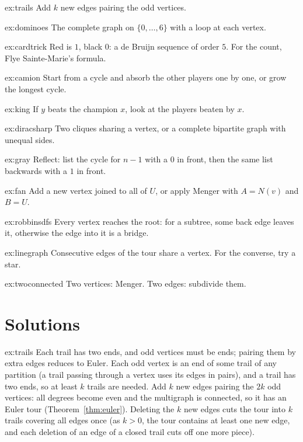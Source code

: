 \begin{hint}{ex:trails}
Add $k$ new edges pairing the odd vertices.
\end{hint}
\begin{hint}{ex:dominoes}
The complete graph on $\{0,\dots,6\}$ with a loop at each vertex.
\end{hint}
\begin{hint}{ex:cardtrick}
Red is $1$, black $0$: a de Bruijn sequence of order $5$. For the count, Flye Sainte-Marie's formula.
\end{hint}
\begin{hint}{ex:camion}
Start from a cycle and absorb the other players one by one, or grow the longest cycle.
\end{hint}
\begin{hint}{ex:king}
If $y$ beats the champion $x$, look at the players beaten by $x$.
\end{hint}
\begin{hint}{ex:diracsharp}
Two cliques sharing a vertex, or a complete bipartite graph with unequal sides.
\end{hint}
\begin{hint}{ex:gray}
Reflect: list the cycle for $n-1$ with a $0$ in front, then the same list backwards with a $1$ in front.
\end{hint}
\begin{hint}{ex:fan}
Add a new vertex joined to all of $U$, or apply Menger with $A=N(v)$ and $B=U$.
\end{hint}
\begin{hint}{ex:robbinsdfs}
Every vertex reaches the root: for a subtree, some back edge leaves it, otherwise the edge into it is a bridge.
\end{hint}
\begin{hint}{ex:linegraph}
Consecutive edges of the tour share a vertex. For the converse, try a star.
\end{hint}
\begin{hint}{ex:twoconnected}
Two vertices: Menger. Two edges: subdivide them.
\end{hint}

\section{Solutions}

\begin{solution}{ex:trails}
\idea Each trail has two ends, and odd vertices must be ends; pairing them by extra edges reduces to Euler.
\writeup Each odd vertex is an end of some trail of any partition (a trail passing through a vertex uses its edges in pairs), and a trail has
two ends, so at least $k$ trails are needed. Add $k$ new edges pairing the $2k$ odd vertices: all degrees become even and the multigraph is
connected, so it has an Euler tour (Theorem~\ref{thm:euler}). Deleting the $k$ new edges cuts the tour into $k$ trails covering all edges
once (as $k>0$, the tour contains at least one new edge, and each deletion of an edge of a closed trail cuts off one more piece).
\end{solution}

